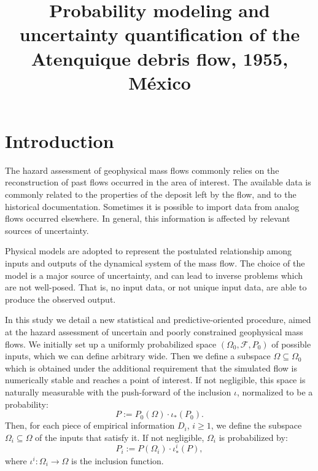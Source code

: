 \documentclass{article}
\begin{document}
\title{Probability modeling and uncertainty quantification of the Atenquique debris flow, 1955, M\'exico}
\author{}
\maketitle
\abstract
\tableofcontents
\newpage

\section{Introduction}
The hazard assessment of geophysical mass flows commonly relies on the reconstruction of past flows occurred in the area of interest. The available data is commonly related to the properties of the deposit left by the flow, and to the historical documentation. Sometimes it is possible to import data from analog flows occurred elsewhere. In general, this information is affected by relevant sources of uncertainty.

Physical models are adopted to represent the postulated relationship among inputs and outputs of the dynamical system of the mass flow. The choice of the model is a major source of uncertainty, and can lead to inverse problems which are not well-posed. That is, no input data, or not unique input data, are able to produce the observed output.

In this study we detail a new statistical and predictive-oriented procedure, aimed at the hazard assessment of uncertain and poorly constrained geophysical mass flows. We initially set up a uniformly probabilized space $(\Omega_0,\mathcal F, P_0)$ of possible inputs, which we can define arbitrary wide. Then we define a subspace $\Omega\subseteq\Omega_0$ which is obtained under the additional requirement that the simulated flow is numerically stable and reaches a point of interest. If not negligible, this space is naturally measurable with the push-forward of the inclusion $\iota$, normalized to be a probability: 
$$P:=P_0(\Omega)\cdot \iota_*(P_0).$$ 
Then, for each piece of empirical information $D_i$, $i\ge 1$, we define the subspace $\Omega_i\subseteq\Omega$ of the inputs that satisfy it. If not negligible, $\Omega_i$ is probabilized by:
$$P_i:=P(\Omega_i)\cdot \iota^i_*(P),$$
where $\iota^i:\Omega_i\rightarrow \Omega$ is the inclusion function.
\end{document}
